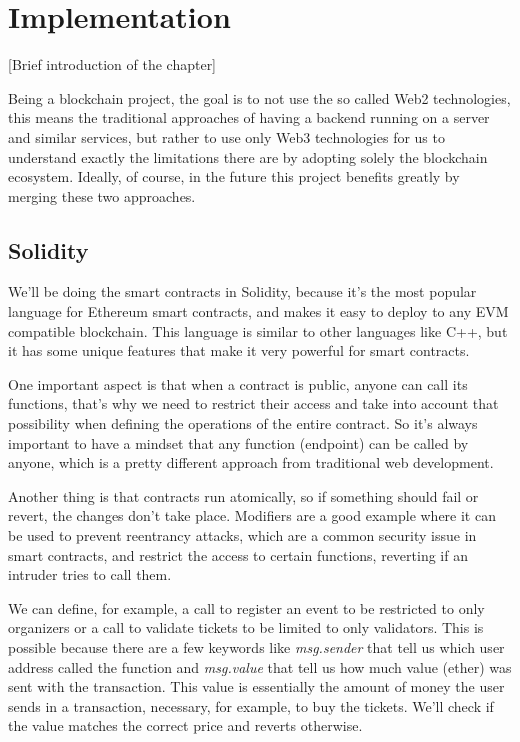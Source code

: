 \chapter{Implementation}
\label{ch:implementation}

[Brief introduction of the chapter]

Being a blockchain project, the goal is to not use the so called Web2 technologies, this means the traditional approaches of having a backend running on a server and similar services, but rather to use only Web3 technologies for us to understand exactly the limitations there are by adopting solely the blockchain ecosystem. Ideally, of course, in the future this project benefits greatly by merging these two approaches.

\section{Solidity}
\label{sec:solidity}

We'll be doing the smart contracts in Solidity, because it's the most popular language for Ethereum smart contracts, and makes it easy to deploy to any EVM compatible blockchain. This language is similar to other languages like C++, but it has some unique features that make it very powerful for smart contracts.

One important aspect is that when a contract is public, anyone can call its functions, that's why we need to restrict their access and take into account that possibility when defining the operations of the entire contract. So it's always important to have a mindset that any function (endpoint) can be called by anyone, which is a pretty different approach from traditional web development.

Another thing is that contracts run atomically, so if something should fail or revert, the changes don't take place. Modifiers are a good example where it can be used to prevent reentrancy attacks, which are a common security issue in smart contracts, and restrict the access to certain functions, reverting if an intruder tries to call them.

We can define, for example, a call to register an event to be restricted to only organizers or a call to validate tickets to be limited to only validators. This is possible because there are a few keywords like \textit{msg.sender} that tell us which user address called the function and \textit{msg.value} that tell us how much value (ether) was sent with the transaction. This value is essentially the amount of money the user sends in a transaction, necessary, for example, to buy the tickets. We'll check if the value matches the correct price and reverts otherwise.

